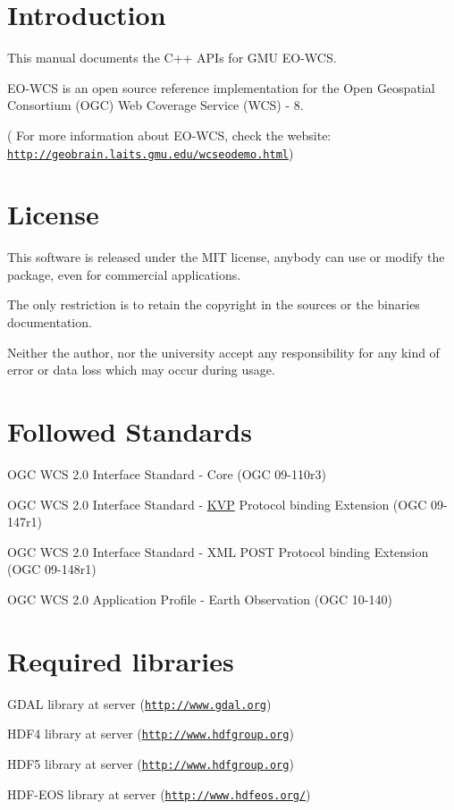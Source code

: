 \hypertarget{index_intro}{}\section{Introduction}\label{index_intro}
This manual documents the C++ APIs for GMU EO-\/WCS.\par
 EO-\/WCS is an open source reference implementation for the Open Geospatial Consortium (OGC) Web Coverage Service (WCS) -\/ 8.\par
 ( For more information about EO-\/WCS, check the website: \href{http://geobrain.laits.gmu.edu/wcseodemo.html}{\tt http://geobrain.laits.gmu.edu/wcseodemo.html})\par
\hypertarget{index_license}{}\section{License}\label{index_license}
This software is released under the MIT license, anybody can use or modify the package, even for commercial applications.\par
 The only restriction is to retain the copyright in the sources or the binaries documentation.\par
 Neither the author, nor the university accept any responsibility for any kind of error or data loss which may occur during usage.\hypertarget{index_standards}{}\section{Followed Standards}\label{index_standards}

\begin{DoxyItemize}
\item OGC WCS 2.0 Interface Standard -\/ Core (OGC 09-\/110r3)
\item OGC WCS 2.0 Interface Standard -\/ \hyperlink{classKVP}{KVP} Protocol binding Extension (OGC 09-\/147r1)
\item OGC WCS 2.0 Interface Standard -\/ XML POST Protocol binding Extension (OGC 09-\/148r1)
\item OGC WCS 2.0 Application Profile -\/ Earth Observation (OGC 10-\/140)
\end{DoxyItemize}\hypertarget{index_reqlibs}{}\section{Required libraries}\label{index_reqlibs}

\begin{DoxyItemize}
\item GDAL library at server (\href{http://www.gdal.org}{\tt http://www.gdal.org})
\item HDF4 library at server (\href{http://www.hdfgroup.org}{\tt http://www.hdfgroup.org})
\item HDF5 library at server (\href{http://www.hdfgroup.org}{\tt http://www.hdfgroup.org})
\item HDF-\/EOS library at server (\href{http://www.hdfeos.org/}{\tt http://www.hdfeos.org/})
\end{DoxyItemize}

